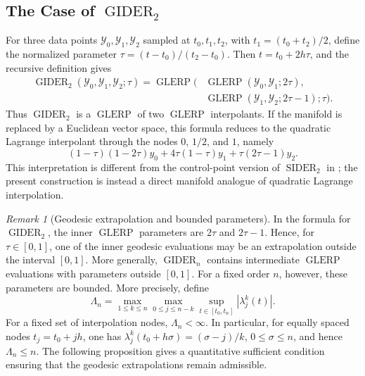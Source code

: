 \documentclass[a4paper,11pt]{article}
\newcommand{\SIDER}{\operatorname{SIDER}}
\newcommand{\GLERP}{\operatorname{GLERP}}
\newcommand{\GIDER}{\operatorname{GIDER}}
\numberwithin{equation}{section}
\theoremstyle{plain}
\theoremstyle{definition}
\theoremstyle{remark}
\newtheorem{remark}[thm]{Remark}
\begin{document}
\subsection{The Case of \(\GIDER_2\)}

For three data points \(\mathcal{Y}_0,\mathcal{Y}_1,\mathcal{Y}_2\) sampled at \(t_0,t_1,t_2\), with \(t_1=(t_0+t_2)/2\), define the normalized parameter \(\tau=(t-t_0)/(t_2-t_0)\).  Then \(t=t_0+2h\tau\), and the recursive definition gives
\[
\begin{split}
    \GIDER_2(\mathcal{Y}_0,\mathcal{Y}_1,\mathcal{Y}_2;\tau)
    =
    \GLERP\Big(&
        \GLERP(\mathcal{Y}_0,\mathcal{Y}_1;2\tau),\\
        &
        \GLERP(\mathcal{Y}_1,\mathcal{Y}_2;2\tau-1);
        \tau
    \Big).
\end{split}
\]
Thus \(\GIDER_2\) is a \(\GLERP\) of two \(\GLERP\) interpolants.  If the manifold is replaced by a Euclidean vector space, this formula reduces to the quadratic Lagrange interpolant through the nodes \(0\), \(1/2\), and \(1\), namely
\[
    (1-\tau)(1-2\tau)y_0
    +
    4\tau(1-\tau)y_1
    +
    \tau(2\tau-1)y_2.
\]
This interpretation is different from the control-point version of \(\SIDER_2\) in \cite{FongLeung2023}; the present construction is instead a direct manifold analogue of quadratic Lagrange interpolation.

\begin{remark}[Geodesic extrapolation and bounded parameters]
In the formula for \(\GIDER_2\), the inner \(\GLERP\) parameters are \(2\tau\) and \(2\tau-1\).  Hence, for \(\tau\in[0,1]\), one of the inner geodesic evaluations may be an extrapolation outside the interval \([0,1]\).  More generally, \(\GIDER_n\) contains intermediate \(\GLERP\) evaluations with parameters outside \([0,1]\).  For a fixed order \(n\), however, these parameters are bounded.  More precisely, define
\[
    \Lambda_n
    =
    \max_{1\le k\le n}\max_{0\le j\le n-k}
    \sup_{t\in[t_0,t_n]}
    \left|\lambda_j^k(t)\right|.
\]
For a fixed set of interpolation nodes, \(\Lambda_n<\infty\).  In particular, for equally spaced nodes \(t_j=t_0+jh\), one has \(\lambda_j^k(t_0+h\sigma)=(\sigma-j)/k\), \(0\le \sigma\le n\), and hence \(\Lambda_n\le n\).  The following proposition gives a quantitative sufficient condition ensuring that the geodesic extrapolations remain admissible.
\end{remark}
\end{document}
